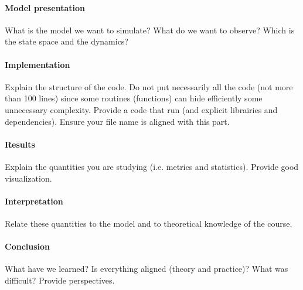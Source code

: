 

\paragraph{Model presentation}
What is the model we want to simulate? What do we want to observe? Which is the state space and the dynamics?

\paragraph{Implementation}
Explain the structure of the code. Do not put necessarily all the code (not more than 100 lines) since some routines (functions) can hide efficiently some unnecessary complexity. Provide a code that run (and explicit librairies and dependencies). Ensure your file name is aligned with this part.

 \paragraph{Results}
 Explain the quantities you are studying (i.e. metrics and statistics). Provide good visualization.
 
\paragraph{Interpretation}
Relate these quantities to the model and to theoretical knowledge of the course.

 \paragraph{Conclusion}
 What have we learned? Is everything aligned (theory and practice)? What was difficult? Provide perspectives.
 

